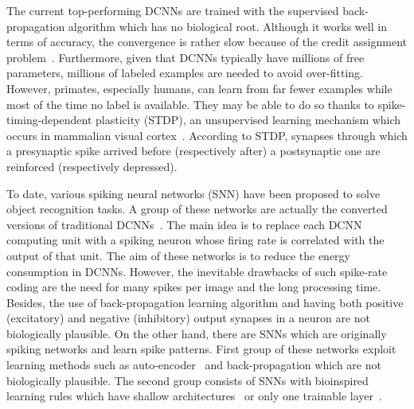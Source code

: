 \documentclass[preprint,5p,12pt,twocolumn]{article}
\begin{document}
The current top-performing DCNNs are trained with the supervised back-propagation algorithm which has no biological root. Although it works well in terms of accuracy, the convergence is rather slow because of the credit assignment problem~\cite{edmund2002computational}. Furthermore, given that DCNNs typically have millions of free parameters, millions of labeled examples are needed to avoid over-fitting.  However, primates, especially humans, can learn from far fewer examples while most of the time no label is available. They may be able to do so thanks to spike-timing-dependent plasticity (STDP), an unsupervised learning mechanism which occurs in mammalian visual cortex~\cite{meliza2006receptive,huang2014associative,mcmahon2012stimulus}. According to STDP, synapses through which a presynaptic spike arrived before (respectively after) a postsynaptic one are reinforced (respectively depressed). 

To date, various spiking neural networks (SNN) have been  proposed to solve object recognition tasks. A group of these networks are actually the converted versions of traditional DCNNs~\cite{cao2015spiking,hunsberger2015spiking,diehl2016conversion}. The main idea is to replace each DCNN computing unit with a spiking neuron whose firing rate is correlated with the output of that unit.  The aim of these networks is to reduce the energy consumption in DCNNs. However, the inevitable drawbacks of such spike-rate coding are the need for many spikes per image and the long processing time. Besides, the use of back-propagation learning algorithm and having both positive (excitatory) and negative (inhibitory) output synapses in a neuron are not biologically plausible. On the other hand, there are SNNs which are originally spiking networks and learn spike patterns. First group of these networks exploit learning methods such as auto-encoder~\cite{panda2016unsupervised,burbank2015mirrored} and back-propagation\cite{bengio2015towards} which are not biologically plausible. The second group consists of SNNs with bioinspired learning rules which have shallow architectures~\cite{brader2007learning,habenschuss2012homeostatic,querlioz2013immunity,zhao2015feedforward,diehl2015unsupervised} or only one trainable layer~\cite{masquelier2007unsupervised,beyeler2013categorization,kheradpisheh2016bio}.
\end{document}
